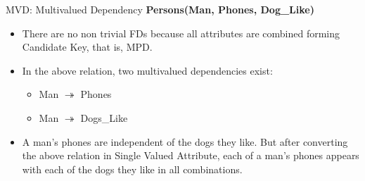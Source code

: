 \documentclass[aspectratio=169, xcolor=dvipsnames]{beamer}
\begin{document}
\begin{frame}{MVD: Multivalued Dependency}
    \textbf{Persons(Man, Phones, Dog\_Like)}
    \begin{table}
    \centering
    \end{table}
    \begin{itemize}[<+->]
        \item There are no non trivial FDs because all attributes are combined forming Candidate Key, that is, MPD.
        \item In the above relation, two multivalued dependencies exist:
        \begin{itemize}
            \item[$\triangleright$] Man $\twoheadrightarrow$ Phones
            \item[$\triangleright$] Man $\twoheadrightarrow$ Dogs\_Like
        \end{itemize}
        \item A man's phones are independent of the dogs they like. But after converting the above relation in Single Valued Attribute, each of a man's phones appears with each of the dogs they like in all combinations.
    \end{itemize}
\end{frame}
\end{document}
